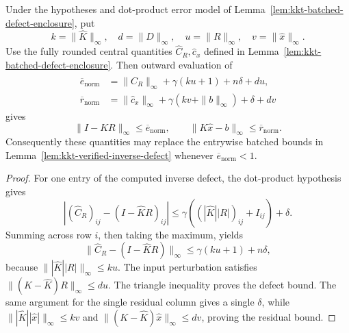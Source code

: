 \begin{lemma}%
\label{lem:kkt-normwise-defect-enclosure}
Under the hypotheses and dot-product error model of
Lemma~\ref{lem:kkt-batched-defect-enclosure}, put
\[
 k=\|\widehat K\|_\infty,\quad
 d=\|D\|_\infty,\quad
 u=\|R\|_\infty,\quad
 v=\|\widehat x\|_\infty.
\]
Use the fully rounded central quantities
\(\widehat C_R,\widehat c_x\) defined in
Lemma~\ref{lem:kkt-batched-defect-enclosure}.
Then outward evaluation of
\[
 \begin{aligned}
 \overline e_{\mathrm{norm}}
 &=\|\widehat C_R\|_\infty
   +\gamma(ku+1)+n\delta+du,\\
 \overline r_{\mathrm{norm}}
 &=\|\widehat c_x\|_\infty
   +\gamma(kv+\|b\|_\infty)+\delta+dv
 \end{aligned}
\]
gives
\[
 \|I-KR\|_\infty\leq\overline e_{\mathrm{norm}},\qquad
 \|K\widehat x-b\|_\infty\leq\overline r_{\mathrm{norm}}.
\]
Consequently these quantities may replace the entrywise batched bounds in
Lemma~\ref{lem:kkt-verified-inverse-defect} whenever
\(\overline e_{\mathrm{norm}}<1\).
\end{lemma}

\begin{proof}
For one entry of the computed inverse defect, the dot-product hypothesis gives
\[
 \left|
 (\widehat C_R)_{ij}
 -(I-\widehat K R)_{ij}
 \right|
 \leq
 \gamma\left((|\widehat K||R|)_{ij}+I_{ij}\right)+\delta.
\]
Summing across row \(i\), then taking the maximum, yields
\[
 \|\widehat C_R-(I-\widehat K R)\|_\infty
 \leq\gamma(ku+1)+n\delta,
\]
because
\(\||\widehat K||R|\|_\infty\leq ku\).
The input perturbation satisfies
\(\|(K-\widehat K)R\|_\infty\leq du\).
The triangle inequality proves the defect bound.  The same argument for the
single residual column gives a single \(\delta\), while
\(\||\widehat K||\widehat x|\|_\infty\leq kv\) and
\(\|(K-\widehat K)\widehat x\|_\infty\leq dv\), proving the residual bound.
\end{proof}

